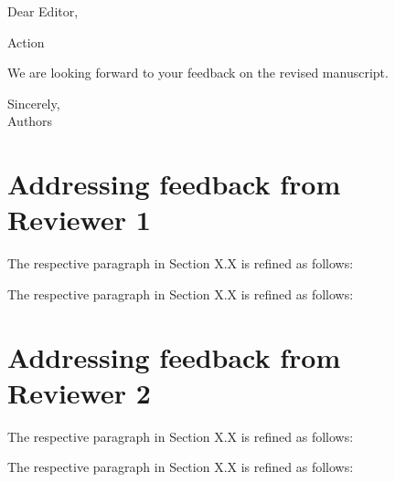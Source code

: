 \documentclass{article}
\begin{document}
\noindent Dear Editor, 
\vspace{1em}

\begin{responseChange}[MC]
    \changeItem[name] \label{ch:trafo} Action

\end{responseChange}

\noindent
We are looking forward to your feedback on the revised manuscript.

\vspace{2em}
\noindent Sincerely,\\
Authors

\newpage
\section{Addressing feedback from Reviewer 1}
\newreview

\begin{review}\label{resp:r1a}
   
\end{review}
\begin{reply}


    The respective paragraph in Section X.X is refined as follows:
    \change{}
\end{reply}

\begin{review}\label{resp:r1b}
   
\end{review}
\begin{reply}

    The respective paragraph in Section X.X is refined as follows:
    \change{}
\end{reply}

\newpage
\section{Addressing feedback from Reviewer 2}
\newreview


\begin{review}\label{resp:r2a}
   
\end{review}
\begin{reply}

    The respective paragraph in Section X.X is refined as follows:
    \change{}
\end{reply}

\begin{review}\label{resp:r2b}
   
\end{review}
\begin{reply}


    The respective paragraph in Section X.X is refined as follows:
    \change{}
\end{reply}
\end{document}

